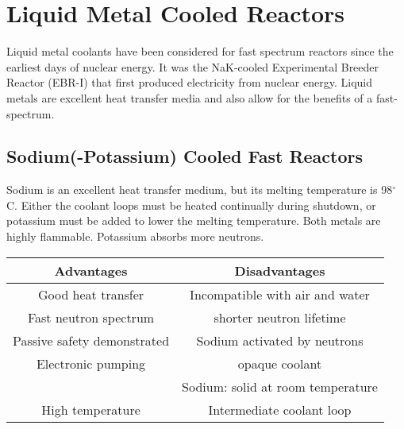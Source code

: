 \section{Liquid Metal Cooled Reactors}
Liquid metal coolants have been considered for fast spectrum reactors since the earliest days of nuclear energy. It was the NaK-cooled Experimental Breeder Reactor (EBR-I) that first produced electricity from nuclear energy.
Liquid metals are excellent heat transfer media and also allow for the benefits of a fast-spectrum.

\subsection{Sodium(-Potassium) Cooled Fast Reactors}
Sodium is an excellent heat transfer medium, but its melting temperature is 98$^{\circ}$C. Either the coolant loops must be heated continually during shutdown, or potassium must be added to lower the melting temperature. Both metals are highly flammable. Potassium absorbs more neutrons.
\begin{table}[!h]
\begin{tabular}{c|c}
  Advantages & Disadvantages \\
  \hline
  Good heat transfer & Incompatible with air and water\\
  Fast neutron spectrum & shorter neutron lifetime\\
  Passive safety demonstrated & Sodium activated by neutrons \\
  Electronic pumping & opaque coolant\\
  & Sodium: solid at room temperature\\
  High temperature & Intermediate coolant loop\\
\end{tabular}
\end{table}

